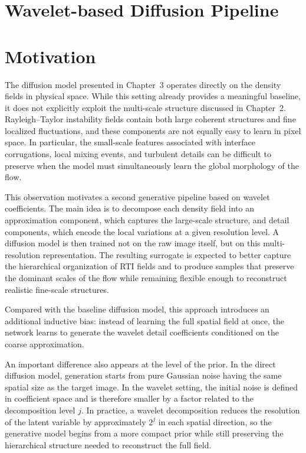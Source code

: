 \section{Wavelet-based Diffusion Pipeline}

\section{Motivation}

The diffusion model presented in Chapter~3 operates directly on the density
fields in physical space. While this setting already provides a meaningful
baseline, it does not explicitly exploit the multi-scale structure discussed in
Chapter~2. Rayleigh--Taylor instability fields contain both large coherent
structures and fine localized fluctuations, and these components are not
equally easy to learn in pixel space. In particular, the small-scale features
associated with interface corrugations, local mixing events, and turbulent
details can be difficult to preserve when the model must simultaneously learn
the global morphology of the flow.

This observation motivates a second generative pipeline based on wavelet
coefficients. The main idea is to decompose each density field into an
approximation component, which captures the large-scale structure, and detail
components, which encode the local variations at a given resolution level. A
diffusion model is then trained not on the raw image itself, but on this
multi-resolution representation. The resulting surrogate is expected to better
capture the hierarchical organization of RTI fields and to produce samples that
preserve the dominant scales of the flow while remaining flexible enough to
reconstruct realistic fine-scale structures.

Compared with the baseline diffusion model, this approach introduces an
additional inductive bias: instead of learning the full spatial field at once,
the network learns to generate the wavelet detail coefficients conditioned on
the coarse approximation. 

An important difference also appears at the level of the prior. In the direct
diffusion model, generation starts from pure Gaussian noise having the same
spatial size as the target image. In the wavelet setting, the initial noise is
defined in coefficient space and is therefore smaller by a factor related to
the decomposition level $j$. In practice, a wavelet decomposition reduces the
resolution of the latent variable by approximately $2^j$ in each spatial
direction, so the generative model begins from a more compact prior while
still preserving the hierarchical structure needed to reconstruct the full
field.

